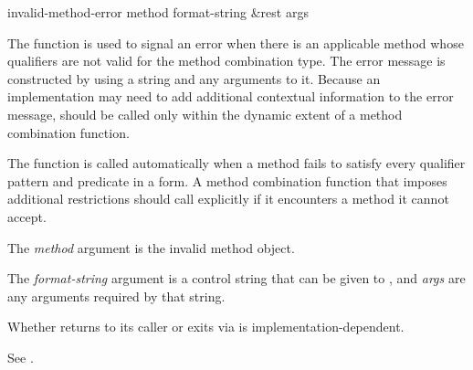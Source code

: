 \begin{defun}[Function]
invalid-method-error method format-string &rest args

The function  is used to signal an error
when there is an applicable method whose qualifiers are not valid for
the method combination type.  The error message is constructed by
using a  string and any arguments to it.  Because an
implementation may need to add additional contextual information to
the error message,  should be called only
within the dynamic extent of a method combination function.

The function  is called automatically when a
method fails to satisfy every qualifier pattern and predicate in a
 form.
A method combination function
that imposes additional restrictions should call 
 explicitly if it encounters a method it cannot
accept.





The {\it method\/} argument is the invalid method object.  

The {\it format-string\/} argument is a control string that can be
given to , and {\it args\/} are any arguments required by
that string.


Whether  returns to its caller or exits via
 is implementation-dependent.

See .

\end{defun}


